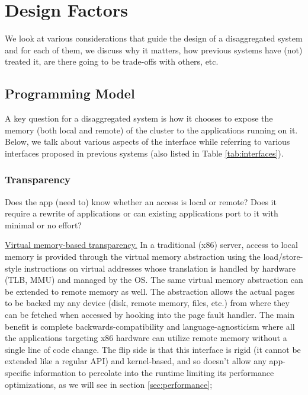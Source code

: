 
\section{Design Factors}
\label{sec:design}
We look at various considerations that guide the design of a 
disaggregated system and for each of them, we discuss why it 
matters, how previous systems have (not) treated it, are there 
going to be trade-offs with others, etc. 

\subsection{Programming Model}
A key question for a disaggregated system is how it 
chooses to expose the memory (both local and remote) of the 
cluster to the applications running on it. Below, we talk about 
various aspects of the interface while referring to 
various interfaces proposed in previous systems 
(also listed in Table \ref{tab:interfaces}).

\subsubsection{Transparency}
Does the app (need to) know whether an access is local or 
remote? Does it require a rewrite of applications or can 
existing applications port to it with minimal or no effort?

\vspace{3pt}
\noindent \uline{Virtual memory-based transparency.}
In a traditional (x86) server, access to local memory is 
provided through the virtual memory abstraction using 
the load/store-style instructions on virtual addresses 
whose translation is handled by hardware (TLB, MMU) and 
managed by the OS. The same virtual memory abstraction can 
be extended to remote memory as well. The abstraction 
allows the actual pages to be backed my any device 
(disk, remote memory, files, etc.) from where they can 
be fetched when accessed by hooking into the page fault 
handler. The main benefit is complete backwards-compatibility 
and language-agnosticism where all the applications 
targeting x86 hardware can utilize  
remote memory without a single line of code change. The flip side 
is that this interface is rigid (it cannot be extended like a
regular API) and kernel-based, and so doesn't allow any 
app-specific information to percolate into the runtime limiting
its performance optimizations, as we will see in 
section \ref{sec:performance};

